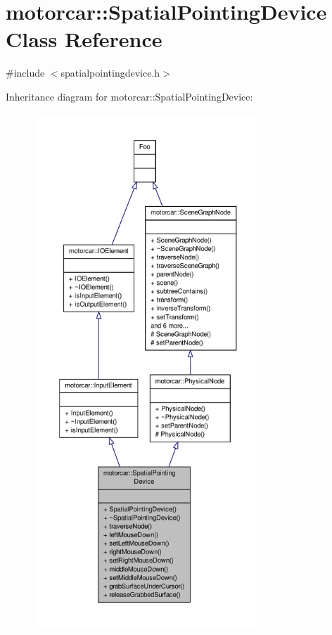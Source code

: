 \hypertarget{classmotorcar_1_1SpatialPointingDevice}{\section{motorcar\-:\-:Spatial\-Pointing\-Device Class Reference}
\label{classmotorcar_1_1SpatialPointingDevice}
}


{\ttfamily \#include $<$spatialpointingdevice.\-h$>$}



Inheritance diagram for motorcar\-:\-:Spatial\-Pointing\-Device\-:
\nopagebreak
\begin{figure}[H]
\begin{center}
\leavevmode
\includegraphics[height=550pt]{classmotorcar_1_1SpatialPointingDevice__inherit__graph}
\end{center}
\end{figure}


